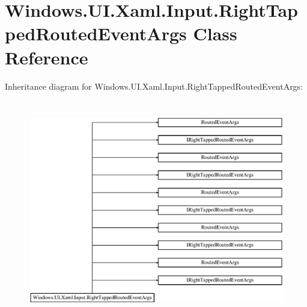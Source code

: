 \hypertarget{class_windows_1_1_u_i_1_1_xaml_1_1_input_1_1_right_tapped_routed_event_args}{}\section{Windows.\+U\+I.\+Xaml.\+Input.\+Right\+Tapped\+Routed\+Event\+Args Class Reference}
\label{class_windows_1_1_u_i_1_1_xaml_1_1_input_1_1_right_tapped_routed_event_args}
Inheritance diagram for Windows.\+U\+I.\+Xaml.\+Input.\+Right\+Tapped\+Routed\+Event\+Args\+:\begin{figure}[H]
\begin{center}
\leavevmode
\includegraphics[height=9.625000cm]{class_windows_1_1_u_i_1_1_xaml_1_1_input_1_1_right_tapped_routed_event_args}
\end{center}
\end{figure}
